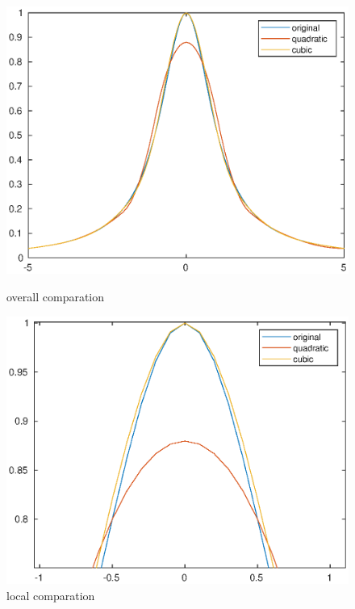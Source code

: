 \documentclass[twoside,a4paper]{article}
\begin{document}
\begin{figure}[h]
\includegraphics[width=6in]{./figure/qc_comp_overall.eps}
\caption{overall comparation}
\includegraphics[width=6in]{./figure/qc_comp_local.eps}
\caption{local comparation}
\end{figure}
\end{document}
